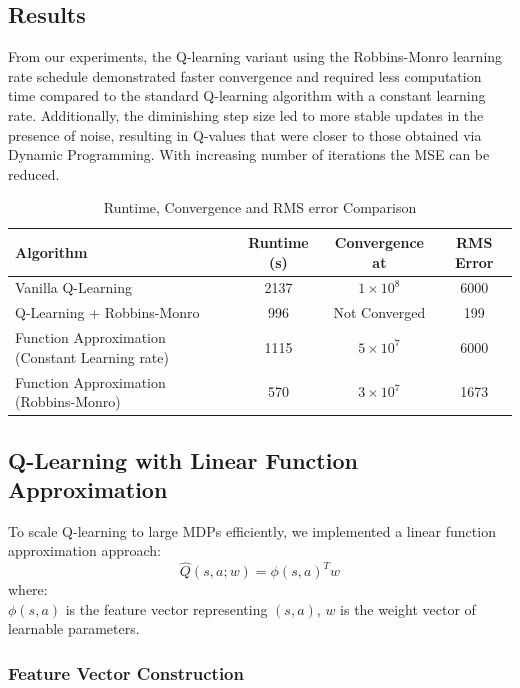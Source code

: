 \documentclass[10pt,twocolumn,letterpaper]{article}
\begin{document}
\subsection*{Results}

From our experiments, the Q-learning variant using the Robbins-Monro learning rate schedule demonstrated faster convergence and required less computation time compared to the standard Q-learning algorithm with a constant learning rate. Additionally, the diminishing step size led to more stable updates in the presence of noise, resulting in Q-values that were closer to those obtained via Dynamic Programming. With increasing number of iterations the MSE can be reduced.

\begin{table}[t]
\noindent
\begin{minipage}{\linewidth}
\raggedright
\caption{Runtime, Convergence and RMS error Comparison}
\label{tab:runtime}
\begin{tabular}{|l|c|c|c|}
\hline
\textbf{Algorithm} & \textbf{Runtime (s)} & \textbf{Convergence at} & \textbf{RMS Error} \\
\hline
Vanilla Q-Learning & 2137 & $1 \times 10^{8}$  & 6000\\
Q-Learning + Robbins-Monro & 996 & Not Converged & 199\\
Function Approximation (Constant Learning rate) & 1115 & $5 \times 10^{7}$  & 6000\\
Function Approximation (Robbins-Monro) & 570 & $3 \times 10^{7}$  & 1673\\
\hline
\end{tabular}
\end{minipage}
\end{table}


\subsection*{Q-Learning with Linear Function Approximation}

To scale Q-learning to large MDPs efficiently, we implemented a linear function approximation approach:
$$
\hat{Q}(s, a; w) = \phi(s, a)^T w
$$
where:
\\
 $\phi(s, a)$ is the feature vector representing $(s,a)$,
 $w$ is the weight vector of learnable parameters.

\subsubsection*{Feature Vector Construction}
\end{document}
